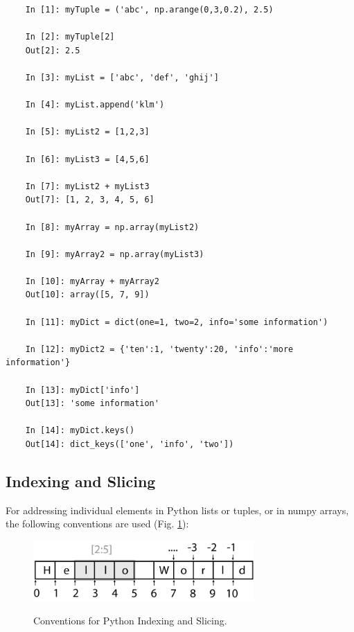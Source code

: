 \begin{lstlisting}
    In [1]: myTuple = ('abc', np.arange(0,3,0.2), 2.5)

    In [2]: myTuple[2]
    Out[2]: 2.5

    In [3]: myList = ['abc', 'def', 'ghij']

    In [4]: myList.append('klm')

    In [5]: myList2 = [1,2,3]

    In [6]: myList3 = [4,5,6]

    In [7]: myList2 + myList3
    Out[7]: [1, 2, 3, 4, 5, 6]

    In [8]: myArray = np.array(myList2)

    In [9]: myArray2 = np.array(myList3)

    In [10]: myArray + myArray2
    Out[10]: array([5, 7, 9])

    In [11]: myDict = dict(one=1, two=2, info='some information')

    In [12]: myDict2 = {'ten':1, 'twenty':20, 'info':'more information'}

    In [13]: myDict['info']
    Out[13]: 'some information'

    In [14]: myDict.keys()
    Out[14]: dict_keys(['one', 'info', 'two'])
\end{lstlisting}

\subsection{Indexing and Slicing}

For addressing individual elements in Python lists or tuples, or in numpy arrays, the following conventions are used (Fig. \ref{fig:indexing}):

\begin{figure}[H]
  \centering
  \includegraphics[width=0.75\textwidth]{../Images/IndexingAndSlicing.png}\\
  \caption{Conventions for Python Indexing and Slicing.}
  \label{fig:indexing}
\end{figure}

